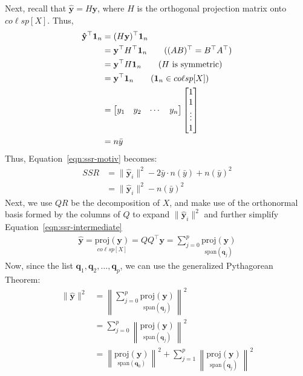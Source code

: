 \documentclass[12pt, a4paper]{article}
\theoremstyle{definition}
\begin{document}
	Next, recall that $\mathbf{\hat{y}}=H\mathbf{y}$, where $H$ is the orthogonal
	projection matrix onto $co\ell sp[X]$. Thus,
	\begin{align*}
		\mathbf{\hat{y}}^\top\mathbf{1}_n&=(H\mathbf{y})^\top \mathbf{1}_n\\
		&=\mathbf{y}^\top H^\top\mathbf{1}_n
		\tag{$(AB)^\top = B^\top A^\top$}\\
		&=\mathbf{y}^\top H \mathbf{1}_n
		\tag{$H$ is symmetric}\\
		&=\mathbf{y}^\top\mathbf{1}_n
		\tag{$\mathbf{1}_n\in co\ell sp[X]$}\\
		&=\begin{bmatrix}
			y_1 & y_2 & \cdots& y_n
		\end{bmatrix}
		\begin{bmatrix}
			1\\
			1\\
			\vdots\\
			1
		\end{bmatrix}\\
		&=n\bar{y}
	\end{align*}
	Thus, Equation~\ref{eqn:ssr-motiv} becomes:
	\begin{align}
		SSR
		&= \|\mathbf{\hat{y}}_i\|^2 - 2\bar{y} \cdot n(\bar{y}) + n(\bar{y})^2\nonumber\\
		&=\|\mathbf{\hat{y}}_i\|^2 - n(\bar{y})^2
		\label{eqn:ssr-intermediate}
	\end{align}
	Next, we use $QR$ be the decomposition of $X$, and make use of the orthonormal basis
	formed by the columns of $Q$ to expand $\|\mathbf{\hat{y}}_i\|^2$ and further simplify
	Equation~\ref{eqn:ssr-intermediate}
	\begin{align*}
		\mathbf{\hat{y}}
		=\underset{co\ell sp[X]}{\text{proj}(\mathbf{y})}
		=QQ^\top \mathbf{y}
		=\sum_{j=0}^{p}\underset{\text{span}(\mathbf{q}_j)}{\text{proj}(\mathbf{y})}
	\end{align*}
	Now, since the list $\mathbf{q}_1,\mathbf{q}_2,\ldots,\mathbf{q}_p$, we can use
	the generalized Pythagorean Theorem:
	\begin{align*}
		\|\mathbf{\hat{y}}\|^2
		&=\left\|\sum_{j=0}^{p}
		\underset{\text{span}(\mathbf{q}_j)}{\text{proj}(\mathbf{y})}
		\right\|^2\\
		&=\sum_{j=0}^{p}\left\|
		\underset{\text{span}(\mathbf{q}_j)}{\text{proj}(\mathbf{y})}
		\right\|^2
		\tag{by orthogonality}\\
		&=\left\|\underset{\text{span}(\mathbf{q}_0)}{\text{proj}(\mathbf{y})}\right\|^2
		+\sum_{j=1}^{p}\left\|
		\underset{\text{span}(\mathbf{q}_j)}{\text{proj}(\mathbf{y})}
		\right\|^2
	\end{align*}
\end{document}
